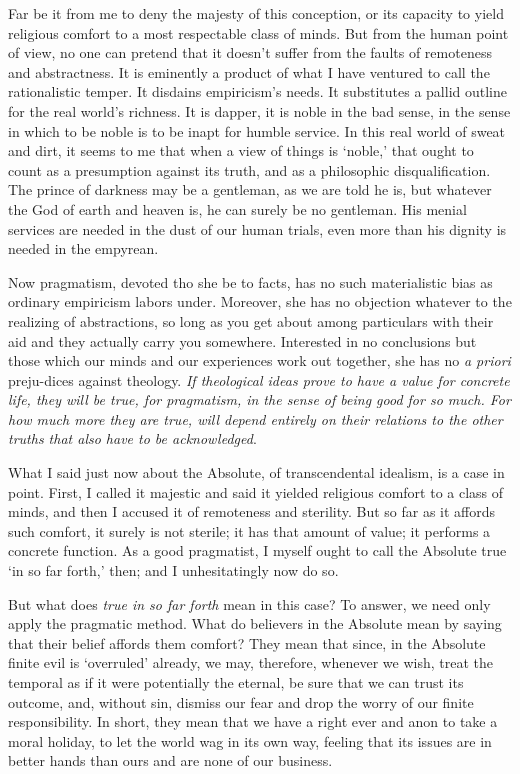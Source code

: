 Far be it from me to deny the majesty of this conception, or its
capacity to yield religious comfort to a most respectable class of
minds. But from the human point of view, no one can pretend that it
doesn't suffer from the faults of remoteness and abstractness. It is
eminently a product of what I have ventured to call the 
rationalistic temper. It disdains empiricism's needs. It substitutes a
pallid outline for the real world's richness. It is dapper, it is
noble in the bad sense, in the sense in which to be noble is to be
inapt for humble service. In this real world of sweat and dirt, it
seems to me that when a view of things is `noble,' that ought to count
as a presumption against its truth, and as a philosophic
disqualification. The prince of darkness may be a gentleman, as we are
told he is, but whatever the God of earth and heaven is, he can surely
be no gentleman. His menial services are needed in the dust of our
human trials, even more than his dignity is needed in the empyrean.

Now pragmatism, devoted tho she be to facts, has no such materialistic
bias as ordinary empiricism labors under. Moreover, she has no
objection whatever to the realizing of abstractions, so long as you
get about among particulars with their aid and they actually carry you
somewhere. Interested in no conclusions but those which our minds and
our experiences work out together, she has no \textit{a priori}
preju-dices against theology. \textit{If theological ideas
prove to have a value for concrete life, they will be true, for
pragmatism, in the sense of being good for so much. For how much more
they are true, will depend entirely on their relations to the other
truths that also have to be acknowledged}.

What I said just now about the Absolute, of transcendental idealism,
is a case in point. First, I called it majestic and said it yielded
religious comfort to a class of minds, and then I accused it of
remoteness and sterility. But so far as it affords such comfort, it
surely is not sterile; it has that amount of value; it performs a
concrete function. As a good pragmatist, I myself ought to call the
Absolute true `in so far forth,' then; and I unhesitatingly now do
so.

But what does \textit{true in so far forth} mean in this case? To
answer, we need only apply the pragmatic method. What do believers in
the Absolute mean by saying that their belief affords them comfort?
They mean that since, in the Absolute finite evil is `overruled'
already, we may, therefore, whenever we wish, treat the 
temporal as if it were potentially the eternal, be sure that we can
trust its outcome, and, without sin, dismiss our fear and drop the
worry of our finite responsibility. In short, they mean that we have a
right ever and anon to take a moral holiday, to let the world wag in
its own way, feeling that its issues are in better hands than ours and
are none of our business.

